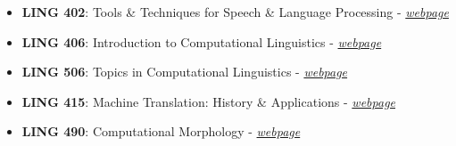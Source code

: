 
\begin{courses}
	\course
	{\begin{itemize}
	
	\item \textbf{LING 402}: Tools \& Techniques for Speech \& Language Processing -  \href{https://courses.illinois.edu/schedule/2022/fall/LING/402}
	{\textit{webpage}}
	
    \item \textbf{LING 406}: Introduction to Computational Linguistics - \href{https://courses.illinois.edu/schedule/2022/fall/LING/406}{\textit{webpage}} %
    
    \item \textbf{LING 506}: Topics in Computational Linguistics - \href{https://courses.illinois.edu/schedule/2022/fall/LING/506}{\textit{webpage}}%
    
    \item \textbf{LING 415}: Machine Translation: History \& Applications - \href{http://computational.linguistics.illinois.edu/ling415/spring2017/index.html}{\textit{webpage}} %
    
        
    \item \textbf{LING 490}: Computational Morphology - \href{http://computational.linguistics.illinois.edu/ling490/spring2019/LS3/}{\textit{webpage}}%
    
     \end{itemize}}
\end{courses}
\vspace{-3mm}